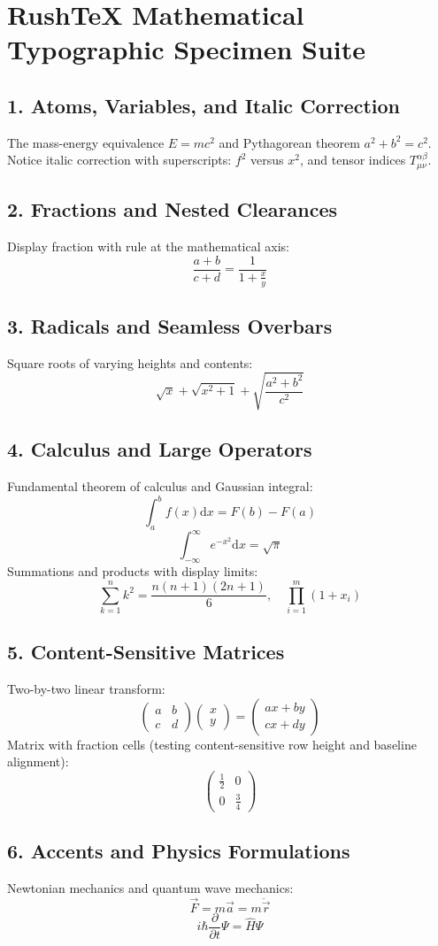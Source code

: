\documentclass{article}
\begin{document}
\section*{RushTeX Mathematical Typographic Specimen Suite}

\subsection*{1. Atoms, Variables, and Italic Correction}
The mass-energy equivalence $E = mc^2$ and Pythagorean theorem $a^2 + b^2 = c^2$.
Notice italic correction with superscripts: $f^2$ versus $x^2$, and tensor indices $T_{\mu\nu}^{\alpha\beta}$.

\subsection*{2. Fractions and Nested Clearances}
Display fraction with rule at the mathematical axis:
\[
\frac{a + b}{c + d} = \frac{1}{1 + \frac{x}{y}}
\]

\subsection*{3. Radicals and Seamless Overbars}
Square roots of varying heights and contents:
\[
\sqrt{x} + \sqrt{x^2 + 1} + \sqrt{\frac{a^2 + b^2}{c^2}}
\]

\subsection*{4. Calculus and Large Operators}
Fundamental theorem of calculus and Gaussian integral:
\[
\int_a^b f(x) \mathrm{d}x = F(b) - F(a)
\]
\[
\int_{-\infty}^\infty e^{-x^2} \mathrm{d}x = \sqrt{\pi}
\]
Summations and products with display limits:
\[
\sum_{k=1}^n k^2 = \frac{n(n+1)(2n+1)}{6}, \quad \prod_{i=1}^m \left( 1 + x_i \right)
\]

\subsection*{5. Content-Sensitive Matrices}
Two-by-two linear transform:
\[
\begin{pmatrix}
a & b \\
c & d
\end{pmatrix}
\begin{pmatrix}
x \\
y
\end{pmatrix}
=
\begin{pmatrix}
ax + by \\
cx + dy
\end{pmatrix}
\]
Matrix with fraction cells (testing content-sensitive row height and baseline alignment):
\[
\begin{pmatrix}
\frac{1}{2} & 0 \\
0 & \frac{3}{4}
\end{pmatrix}
\]

\subsection*{6. Accents and Physics Formulations}
Newtonian mechanics and quantum wave mechanics:
\[
\vec{F} = m \vec{a} = m \ddot{\vec{r}}
\]
\[
i \hbar \frac{\partial}{\partial t} \Psi = \hat{H} \Psi
\]
\end{document}

